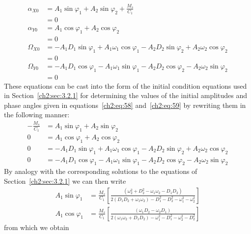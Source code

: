 \begin{align*}
\alpha_{X0} &= A_1\sin\varphi_1 + A_2\sin\varphi_2 + \frac{M_s}{C_1}\\
  &= 0\\
\alpha_{Y0} &= A_1\cos\varphi_1 + A_2\cos\varphi_2\\
  &= 0\\
\Omega_{X0} &= -A_1 D_1\sin\varphi_1 + A_1\omega_1\cos\varphi_1
  - A_2 D_2\sin\varphi_2 + A_2\omega_2\cos\varphi_2\\
  &= 0\\
\Omega_{Y0} &= -A_1 D_1\cos\varphi_1 - A_1\omega_1\sin\varphi_1
  - A_2 D_2\cos\varphi_2 - A_2\omega_2\sin\varphi_2\\
  &= 0
\end{align*}
These equations can be cast into the form of the initial condition equations
used in Section~\ref{ch2:sec:3.2.1} for determining the values of the initial
amplitudes and phase angles given in equations~\eqref{ch2:eq:58}
and~\eqref{ch2:eq:59} by rewriting them in the following manner:
\begin{align*}
-\frac{M_s}{C_1} &= A_1\sin\varphi_1 + A_2\sin\varphi_2\\
0 &= A_1\cos\varphi_1 + A_2\cos\varphi_2\\
0 &= -A_1 D_1\sin\varphi_1 + A_1\omega_1\cos\varphi_1
  - A_2 D_2\sin\varphi_2 + A_2\omega_2\cos\varphi_2\\
0 &= -A_1 D_1\cos\varphi_1 - A_1\omega_1\sin\varphi_1
  - A_2 D_2\cos\varphi_2 - A_2\omega_2\sin\varphi_2
\end{align*}
By analogy with the corresponding solutions to the equations of
Section~\ref{ch2:sec:3.2.1} we can then write
\begin{align*}
A_1\sin\varphi_1 &= \frac{M_s}{C_1}\left[
  \frac{(\omega_2^{2} + D_2^{2} - \omega_1\omega_2 - D_1 D_2)}
       {2(D_1 D_2 + \omega_1\omega_2) - D_1^{2} - D_2^{2} - \omega_1^{2} - \omega_2^{2}}
  \right]\\
A_1\cos\varphi_1 &= \frac{M_s}{C_1}\left[
  \frac{(\omega_1 D_2 - \omega_2 D_1)}
       {2(\omega_1\omega_2 + D_1 D_2) - \omega_1^{2} - D_1^{2} - \omega_2^{2} - D_2^{2}}
  \right]
\end{align*}
from which we obtain
